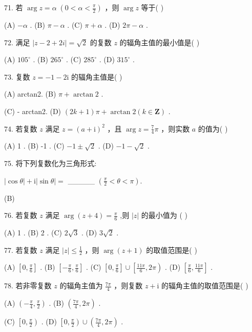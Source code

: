 \documentclass[10pt]{article}
\begin{document}
71. 若 \(\arg z = \alpha \;\left( {0 < \alpha  < \frac{\pi }{2}}\right)\) ，则 \(\arg z\) 等于( )

(A) \(- \alpha\) . (B) \(\pi  - \alpha\) . (C) \(\pi  + \alpha\) . (D) \({2\pi } - \alpha\) .

72. 满足 \(\left| {z - 2 + {2i}}\right|  = \sqrt{2}\) 的复数 \(z\) 的辐角主值的最小值是( )

(A) \({105}^{ \circ  }\) . (B) \({265}^{ \circ  }\) . (C) \({285}^{ \circ  }\) . (D) \({315}^{ \circ  }\) .

73. 复数 \(z =  - 1 - 2\mathrm{i}\) 的辐角主值是( )

(A) arctan2. (B) \(\pi  + \arctan 2\) .

(C) - arctan2. (D) \(\left( {{2k} + 1}\right) \pi  + \arctan 2\left( {k \in  \mathbf{Z}}\right)\) .

74. 若复数 \(z\) 满足 \(z = {\left( a + \mathrm{i}\right) }^{2}\) ，且 \(\arg z = \frac{7}{4}\pi\) ，则实数 \(a\) 的值为( )

(A) 1 . (B) -1 . (C) \(- 1 \pm  \sqrt{2}\) . (D) \(- 1 - \sqrt{2}\) .

75. 将下列复数化为三角形式:

\(\left| {\cos \theta }\right|  + \mathrm{i}\left| {\sin \theta }\right|  =\) \_\_\_\_\_ \(\left( {\frac{\pi }{2} < \theta  < \pi }\right) .\)

(B)

76. 若复数 \(z\) 满足 \(\arg \left( {z + 4}\right)  = \frac{\pi }{6}\) ,则 \(\left| z\right|\) 的最小值为 ( )

(A) 1 . (B) 2 . (C) \(2\sqrt{3}\) . (D) \(3\sqrt{2}\) .

77. 若复数 \(z\) 满足 \(\left| z\right|  \leq  \frac{1}{2}\) ，则 \(\arg \left( {z + 1}\right)\) 的取值范围是( )

(A) \(\left\lbrack  {0,\frac{\pi }{6}}\right\rbrack\) . (B) \(\left\lbrack  {-\frac{\pi }{6},\frac{\pi }{6}}\right\rbrack\) . (C) \(\left\lbrack  {0,\frac{\pi }{6}}\right\rbrack   \cup  \left\lbrack  {\frac{11\pi }{6},{2\pi }}\right)\) . (D) \(\left\lbrack  {\frac{\pi }{6},\frac{11\pi }{6}}\right\rbrack\) .

78. 若非零复数 \(z\) 的辐角主值为 \(\frac{7\pi }{4}\) ，则复数 \(z + \mathrm{i}\) 的辐角主值的取值范围是( )

(A) \(\left( {-\frac{\pi }{4},\frac{\pi }{2}}\right)\) . (B) \(\left( {\frac{7\pi }{4},{2\pi }}\right)\) .

(C) \(\left\lbrack  {0,\frac{\pi }{2}}\right)\) . (D) \(\left\lbrack  {0,\frac{\pi }{2}}\right)  \cup  \left( {\frac{7\pi }{4},{2\pi }}\right)\) .
\end{document}
